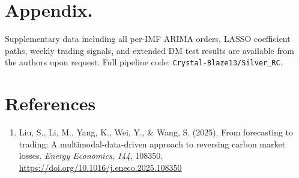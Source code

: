 \documentclass[12pt,a4paper]{article}
\begin{document}
\newpage

\appendix
\section*{Appendix.}

Supplementary data including all per-IMF ARIMA orders, LASSO coefficient paths,
weekly trading signals, and extended DM test results are available from the authors
upon request. Full pipeline code: \texttt{Crystal-Blaze13/Silver\_RC}.

\newpage

\section*{References}

\begin{enumerate}[leftmargin=0pt,label={},itemsep=5pt]

\item Liu, S., Li, M., Yang, K., Wei, Y., \& Wang, S. (2025).
From forecasting to trading: A multimodal-data-driven approach to reversing carbon
market losses. \textit{Energy Economics}, \textit{144}, 108350.
\url{https://doi.org/10.1016/j.eneco.2025.108350}

\end{enumerate}
\end{document}
